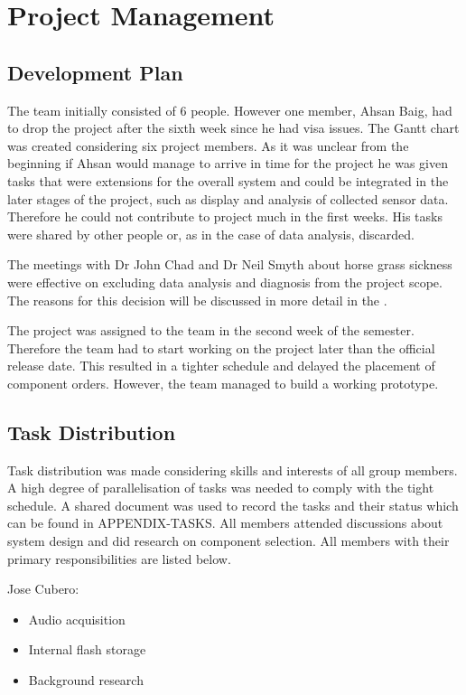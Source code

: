 \chapter{Project Management}


\section{Development Plan}
The team initially consisted of 6 people. However one member, Ahsan Baig, had to drop the project after the sixth week since he had visa issues. The Gantt chart was created considering six project members. As it was unclear from the beginning if Ahsan would manage to arrive in time for the project he was given tasks that were extensions for the overall system and could be integrated in the later stages of the project, such as display and analysis of collected sensor data. Therefore he could not contribute to project much in the first weeks. His tasks were shared by other people or, as in the case of data analysis, discarded. 

The meetings with Dr John Chad and Dr Neil Smyth about horse grass sickness were effective on excluding data analysis and diagnosis from the project scope. The reasons for this decision will be discussed in more detail in the .

The project was assigned to the team in the second week of the semester. Therefore the team had to start working on the project later than the official release date. This resulted in a tighter schedule and delayed the placement of component orders. \TODO{} However, the team managed to build a working prototype.  


\section{Task Distribution}
Task distribution was made considering skills and interests of all group members. A high degree of parallelisation of tasks was needed to comply with the tight schedule. A shared document was used to record the tasks and their status which can be found in APPENDIX-TASKS. All members attended discussions about system design and did research on component selection. All members with their primary responsibilities are listed below. 


Jose Cubero:
\begin{itemize}
\item Audio acquisition
\item Internal flash storage
\item Background research
\end{itemize}

